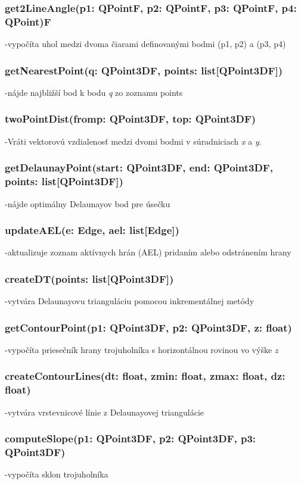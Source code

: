 \documentclass[12pt]{article}
\begin{document}
\subsubsection*{get2LineAngle(p1: QPointF, p2: QPointF, p3: QPointF, p4: QPoint)F}
\noindent -vypočíta uhol medzi dvoma čiarami definovanými bodmi (p1, p2) a (p3, p4)
\subsubsection*{getNearestPoint(q: QPoint3DF, points: list[QPoint3DF])}
\noindent -nájde najbližší bod k bodu \textit{q} zo zoznamu points
\subsubsection*{twoPointDist(from\textunderscore p: QPoint3DF, to\textunderscore p: QPoint3DF)}
\noindent-Vráti vektorovú vzdialenosť medzi dvomi bodmi v súradniciach \textit{x} a \textit{y}.
\subsubsection*{getDelaunayPoint(start: QPoint3DF, end: QPoint3DF, points: list[QPoint3DF])}
\noindent-nájde optimálny Delaunayov bod pre úsečku
\subsubsection*{updateAEL(e: Edge, ael: list[Edge])}
\noindent-aktualizuje zoznam aktívnych hrán (AEL) pridaním alebo odstránením hrany
\subsubsection*{createDT(points: list[QPoint3DF])}
\noindent-vytvára Delaunayovu trianguláciu pomocou inkrementálnej metódy
\subsubsection*{getContourPoint(p1: QPoint3DF, p2: QPoint3DF, z: float)}
\noindent-vypočíta priesečník hrany trojuholníka s horizontálnou rovinou vo výške \textit{z}
\subsubsection*{createContourLines(dt: float, zmin: float, zmax: float, dz: float)}
\noindent-vytvára vrstevnicové línie z Delaunayovej triangulácie
\subsubsection*{computeSlope(p1: QPoint3DF, p2: QPoint3DF, p3: QPoint3DF)}
\noindent-vypočíta sklon trojuholníka
\end{document}
